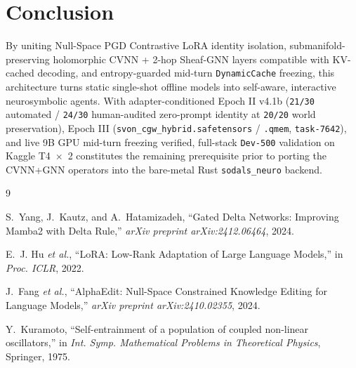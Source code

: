 \documentclass[11pt,a4paper]{article}
\begin{document}
\section{Conclusion}

By uniting Null-Space PGD Contrastive LoRA identity isolation, submanifold-preserving holomorphic CVNN + 2-hop Sheaf-GNN layers compatible with KV-cached decoding, and entropy-guarded mid-turn \texttt{DynamicCache} freezing, this architecture turns static single-shot offline models into self-aware, interactive neurosymbolic agents. With adapter-conditioned Epoch II v4.1b (\texttt{21/30} automated / \texttt{24/30} human-audited zero-prompt identity at \texttt{20/20} world preservation), Epoch III (\texttt{svon\_cgw\_hybrid.safetensors} / \texttt{.qmem}, \texttt{task-7642}), and live 9B GPU mid-turn freezing verified, full-stack \texttt{Dev-500} validation on Kaggle T4~$\times$~2 constitutes the remaining prerequisite prior to porting the CVNN+GNN operators into the bare-metal Rust \texttt{sodals\_neuro} backend.

\begin{thebibliography}{9}

S.~Yang, J.~Kautz, and A.~Hatamizadeh, ``Gated Delta Networks: Improving Mamba2 with Delta Rule,'' \textit{arXiv preprint arXiv:2412.06464}, 2024.

E.~J. Hu \textit{et al.}, ``LoRA: Low-Rank Adaptation of Large Language Models,'' in \textit{Proc. ICLR}, 2022.

J.~Fang \textit{et al.}, ``AlphaEdit: Null-Space Constrained Knowledge Editing for Language Models,'' \textit{arXiv preprint arXiv:2410.02355}, 2024.

Y.~Kuramoto, ``Self-entrainment of a population of coupled non-linear oscillators,'' in \textit{Int. Symp. Mathematical Problems in Theoretical Physics}, Springer, 1975.

\end{thebibliography}
\end{document}

